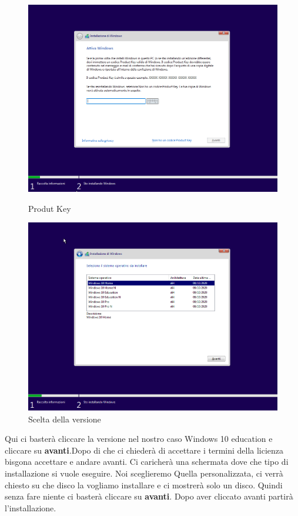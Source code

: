 \documentclass[../main.tex]{subfiles}
\begin{document}
\begin{figure}[h]
  \centering
  \begin{minipage}[h]{0.45\textwidth}
    \includegraphics[width=\textwidth]{Images/conf2.PNG}
    \caption{Produt Key}
  \end{minipage}
  \hfill
  \begin{minipage}[h]{0.45\textwidth}
    \includegraphics[width=\textwidth]{Images/conf3.PNG}
    \caption{Scelta della versione}
  \end{minipage}
\end{figure}



Qui ci basterà cliccare la versione nel nostro caso Windows  10 education e cliccare su \textbf{avanti}.Dopo di che ci chiederà di accettare i termini della licienza bisgona accettare e andare avanti. Ci caricherà una schermata dove che tipo di installazione si vuole eseguire. Noi sceglieremo Quella personalizzata, ci verrà chiesto su che disco la vogliamo installare e ci mostrerà solo un disco. Quindi senza fare niente ci basterà cliccare su \textbf{avanti}. Dopo aver cliccato avanti partirà l'installazione. 
\end{document}
